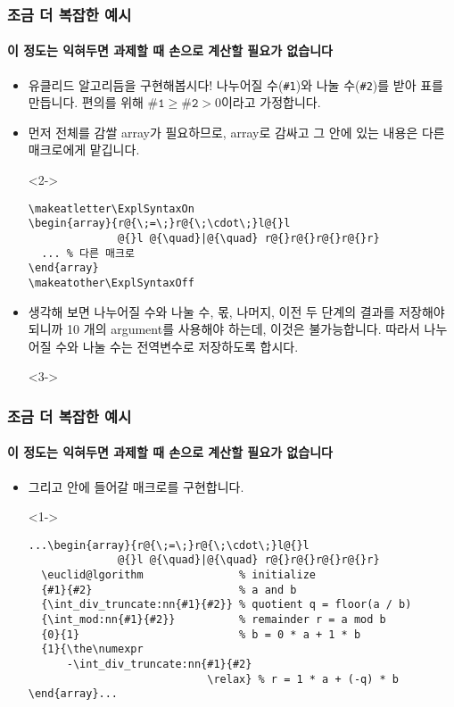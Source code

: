 
\begin{frame}[fragile]
  \frametitle{조금 더 복잡한 예시}
  \framesubtitle{이 정도는 익혀두면 과제할 때 손으로 계산할 필요가 없습니다}
  \begin{itemize}
    \item<1-> 유클리드 알고리듬을 구현해봅시다! 나누어질 수(\texttt{\#1})와 나눌 수(\texttt{\#2})를 받아 표를 만듭니다. 편의를 위해 $\texttt{\#1}\ge\texttt{\#2} > 0$이라고 가정합니다.
    \item<2-> 먼저 전체를 감쌀 array가 필요하므로, array로 감싸고 그 안에 있는 내용은 다른 매크로에게 맡깁니다.
    \item[]<2-> \vspace{-1.5em}\begin{verbatim}
\makeatletter\ExplSyntaxOn
\begin{array}{r@{\;=\;}r@{\;\cdot\;}l@{}l
              @{}l @{\quad}|@{\quad} r@{}r@{}r@{}r@{}r}
  ... % 다른 매크로
\end{array}
\makeatother\ExplSyntaxOff
    \end{verbatim}
    \item<3-> 생각해 보면 나누어질 수와 나눌 수, 몫, 나머지, 이전 두 단계의 결과를 저장해야 되니까 10 개의 argument를 사용해야 하는데, 이것은 불가능합니다. 따라서 나누어질 수와 나눌 수는 전역변수로 저장하도록 합시다.
    \item[]<3-> \texttt{\gdef\@@a{#1}\gdef\@@b{#2}}
  \end{itemize}
\end{frame}

\begin{frame}[fragile]
  \frametitle{조금 더 복잡한 예시}
  \framesubtitle{이 정도는 익혀두면 과제할 때 손으로 계산할 필요가 없습니다}
  \begin{itemize}
    \item<1-> 그리고 안에 들어갈 매크로를 구현합니다.
    \item[]<1-> \vspace{-1.5em}\begin{verbatim}
...\begin{array}{r@{\;=\;}r@{\;\cdot\;}l@{}l
              @{}l @{\quad}|@{\quad} r@{}r@{}r@{}r@{}r}
  \euclid@lgorithm               % initialize
  {#1}{#2}                       % a and b
  {\int_div_truncate:nn{#1}{#2}} % quotient q = floor(a / b)
  {\int_mod:nn{#1}{#2}}          % remainder r = a mod b
  {0}{1}                         % b = 0 * a + 1 * b
  {1}{\the\numexpr
      -\int_div_truncate:nn{#1}{#2}
                            \relax} % r = 1 * a + (-q) * b
\end{array}...
    \end{verbatim}
  \end{itemize}
\end{frame}

